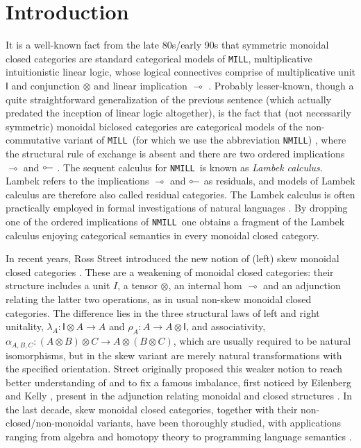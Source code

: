 \documentclass[submission,copyright,creativecommons]{eptcs}
\theoremstyle{definition}
\newcommand{\ot}{\otimes}
\newcommand{\lolli}{\multimap}
\newcommand{\illol}{\rotatebox[origin=c]{180}{$\multimap$}}
\newcommand{\I}{\mathsf{I}}
\newcommand{\MILL}{\texttt{MILL}}
\newcommand{\NMILL}{\texttt{NMILL}}
\begin{document}
\section{Introduction}
It is a well-known fact from the late 80s/early 90s that symmetric monoidal closed categories are standard categorical models of \MILL, multiplicative intuitionistic linear logic, whose logical connectives comprise of multiplicative unit $\I$ and conjunction $\ot$ and linear implication $\lolli$ \cite{mellies:categorical:09}. Probably lesser-known, though a quite straightforward generalization of the previous sentence (which actually predated the inception of linear logic altogether), is the fact that (not necessarily symmetric) monoidal biclosed categories are categorical models of the non-commutative variant of \MILL\ (for which we use the abbreviation \NMILL) \cite{abrusci:noncommutative:1990}, where the structural rule of exchange is absent and there are two ordered implications $\lolli$ and $\illol$ \cite{lambek:deductive:68}. The sequent calculus for \NMILL\ is known as \emph{Lambek calculus}. Lambek refers to the implications $\lolli$ and $\illol$ as residuals, and models of Lambek calculus are therefore also called residual categories. The Lambek calculus is often practically employed in formal investigations of natural languages \cite{lambek:mathematics:58}.
By dropping one of the ordered implications of \NMILL\ one obtains a fragment of the Lambek calculus enjoying categorical semantics in every monoidal closed category.

In recent years, Ross Street introduced the new notion of (left) skew monoidal closed categories \cite{street:skew-closed:2013}. These are a weakening of monoidal closed categories: their structure includes a unit $I$, a tensor $\ot$, an internal hom $\lolli$ and an adjunction relating the latter two operations, as in usual non-skew monoidal closed categories. The difference lies in the three structural laws of left and right unitality, $\lambda_A : \I \ot A \to A$ and $\rho_A : A \to A \ot \I$, and associativity, $\alpha_{A,B,C} : (A \ot B) \ot C \to A \ot (B \ot C)$, which are usually required to be natural isomorphisms, but in the skew variant are merely natural transformations with the specified orientation. Street originally proposed this weaker notion to reach better understanding of and to fix a famous imbalance, first noticed by Eilenberg and Kelly \cite{eilenberg:closed:1966}, present in the adjunction relating monoidal and closed structures \cite{street:skew-closed:2013,uustalu:eilenberg-kelly:2020}. In the last decade, skew monoidal closed categories, together with their non-closed/non-monoidal variants, have been thoroughly studied, with applications ranging from algebra and homotopy theory to programming language semantics \cite{szlachanyi:skew-monoidal:2012,lack:skew:2012,lack:triangulations:2014,altenkirch:monads:2014,buckley:catalan:2015,bourke:skew:2017,bourke:skew:2018,tomita:realizability:21}.
\end{document}
